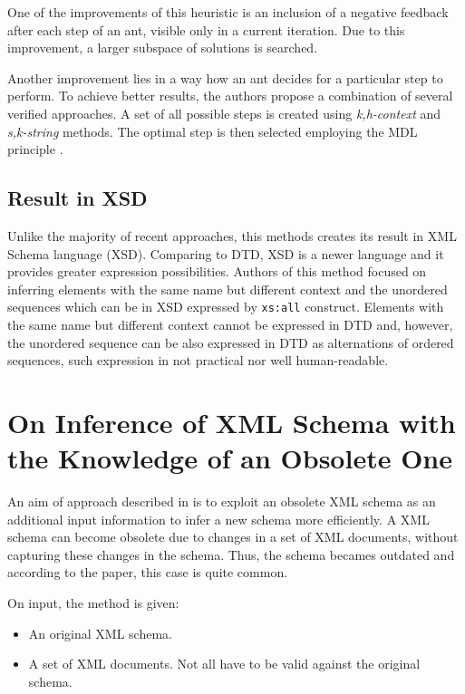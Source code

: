 One of the improvements of this heuristic is an inclusion of a negative feedback after each step of an ant, visible only in a current iteration. Due to this improvement, a larger subspace of solutions is searched.

Another improvement lies in a way how an ant decides for a particular step to perform. To achieve better results, the authors propose a combination of several verified approaches. A set of all possible steps is created using \emph{k,h-context} \cite{Ahonen1996GeneratingGrammars} and \emph{s,k-string} \cite{Raman97thesk-strings, Wong03onstructural} methods. The optimal step is then selected employing the MDL principle \cite{Grünwald05atutorial, Garofalakis:2000:XSE:342009.335409}.

\subsection{Result in XSD}
Unlike the majority of recent approaches, this methods creates its result in XML Schema language (XSD). Comparing to DTD, XSD is a newer language and it provides greater expression possibilities. Authors of this method focused on inferring elements with the same name but different context and the unordered sequences which can be in XSD expressed by \texttt{xs:all} construct. Elements with the same name but different context cannot be expressed in DTD and, however, the unordered sequence can be also expressed in DTD as alternations of ordered sequences, such expression in not practical nor well human-readable.

\section{On Inference of XML Schema with the Knowledge of an Obsolete One}
An aim of approach described in \cite{Mlynkova:2009:IXS:1862681.1862693} is to exploit an obsolete XML schema as an additional input information to infer a new schema more efficiently. A XML schema can become obsolete due to changes in a set of XML documents, without capturing these changes in the schema. Thus, the schema becames outdated and according to the paper, this case is quite common.

On input, the method is given:
\begin{itemize}
\item An original XML schema.
\item A set of XML documents. Not all have to be valid against the original schema.
\end{itemize}

